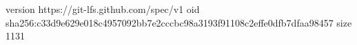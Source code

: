 version https://git-lfs.github.com/spec/v1
oid sha256:c33d9e629e018c4957092bb7e2cccbc98a3193f91108c2effe0dfb7dfaa98457
size 1131
